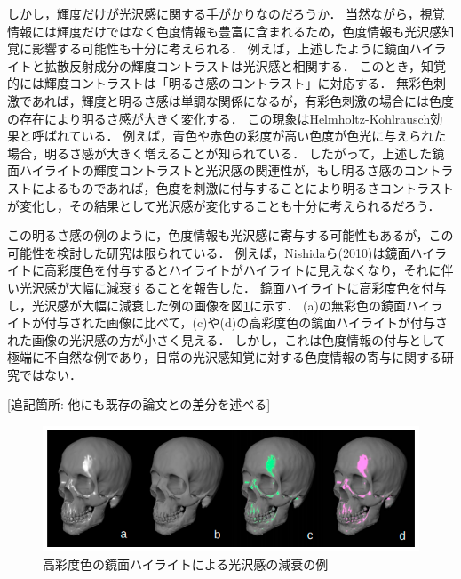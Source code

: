         しかし，輝度だけが光沢感に関する手がかりなのだろうか．
        当然ながら，視覚情報には輝度だけではなく色度情報も豊富に含まれるため，色度情報も光沢感知覚に影響する可能性も十分に考えられる．
        例えば，上述したように鏡面ハイライトと拡散反射成分の輝度コントラストは光沢感と相関する．
        このとき，知覚的には輝度コントラストは「明るさ感のコントラスト」に対応する．
        無彩色刺激であれば，輝度と明るさ感は単調な関係になるが，有彩色刺激の場合には色度の存在により明るさ感が大きく変化する．
        この現象はHelmholtz-Kohlrausch効果と呼ばれている\cite{HKeffect}．
        例えば，青色や赤色の彩度が高い色度が色光に与えられた場合，明るさ感が大きく増えることが知られている．
        したがって，上述した鏡面ハイライトの輝度コントラストと光沢感の関連性が，もし明るさ感のコントラストによるものであれば，色度を刺激に付与することにより明るさコントラストが変化し，その結果として光沢感が変化することも十分に考えられるだろう．

        この明るさ感の例のように，色度情報も光沢感に寄与する可能性もあるが，この可能性を検討した研究は限られている．
        例えば，Nishidaら(2010)は鏡面ハイライトに高彩度色を付与するとハイライトがハイライトに見えなくなり，それに伴い光沢感が大幅に減衰することを報告した\cite{Nishida}．
        鏡面ハイライトに高彩度色を付与し，光沢感が大幅に減衰した例の画像を図\ref{SaturatedLowGloss}に示す．
        (a)の無彩色の鏡面ハイライトが付与された画像に比べて，(c)や(d)の高彩度色の鏡面ハイライトが付与された画像の光沢感の方が小さく見える．
        しかし，これは色度情報の付与として極端に不自然な例であり，日常の光沢感知覚に対する色度情報の寄与に関する研究ではない．

        [追記箇所: 他にも既存の論文との差分を述べる]

        \begin{figure}[h]
            \centering
            \includegraphics[width=15.0cm]{./img/SaturatedLowGloss.png}
            \caption{高彩度色の鏡面ハイライトによる光沢感の減衰の例}
            \label{SaturatedLowGloss}
        \end{figure}


